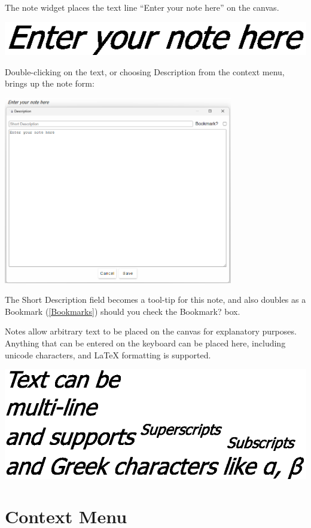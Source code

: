 The note widget places the text line ``Enter your note here'' on
the canvas.

\includegraphics{images/note}

Double-clicking on the text, or choosing Description from the context
menu, brings up the note form:

\includegraphics[width=10cm]{images/NoteWindow}

The Short Description field becomes a tool-tip for this note, and
also doubles as a Bookmark (\ref{Bookmarks}) should you check the
Bookmark? box. 

Notes allow arbitrary text to be placed on the canvas for explanatory
purposes. Anything that can be entered on the keyboard can be placed
here, including unicode characters, and LaTeX formatting is supported. 

\includegraphics{images/Note+Text}

\section{Context Menu}

